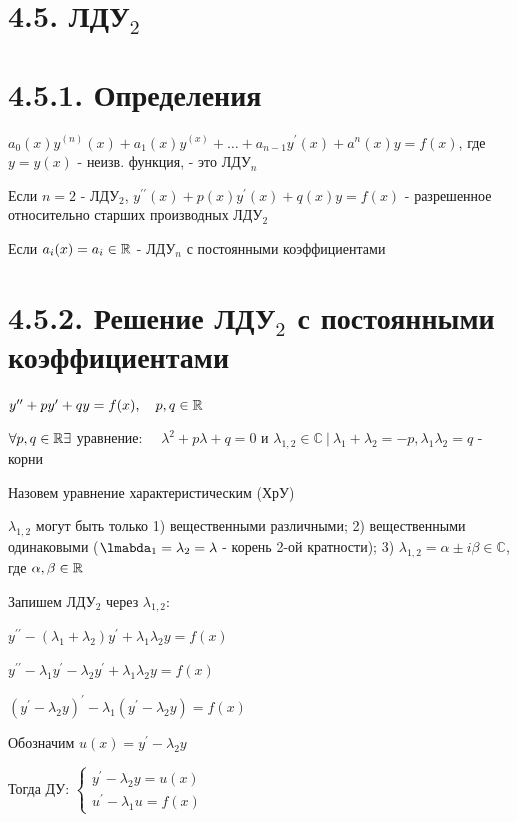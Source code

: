 \documentclass[12pt]{article}
\begin{document}
    \section{4.5. ЛДУ$_2$}


    \section{4.5.1. Определения}

    \Def $a_0(x) y^{(n)}(x) + a_1(x)y^{(x)} + \dots + a_{n - 1}y^\prime(x) + a^n(x)y = f(x)$, где $y = y(x)$ - неизв. функция, - это ЛДУ$_n$

    \Nota Если $n = 2$ - ЛДУ$_2$, $y^{\prime\prime}(x) + p(x)y^\prime(x) + q(x)y = f(x)$ - разрешенное относительно старших производных ЛДУ$_2$

    \Nota Если $a_i(x) = a_i \in \mathbb{R}$ - ЛДУ$_n$ с постоянными коэффициентами


    \section{4.5.2. Решение ЛДУ$_2$ с постоянными коэффициентами}

    $y^{\prime\prime} + p y^\prime + q y = f(x), \quad p, q \in \mathbb{R}$

    $\forall p, q \in \mathbb{R} \exists $ уравнение: $\quad \lambda^2 + p\lambda + q = 0$ и $\lambda_{1,2} \in \mathbb{C} \ | \ \lambda_1 + \lambda_2 = -p, \lambda_1 \lambda_2 = q$ - корни

    Назовем уравнение характеристическим (ХрУ) \Cat

    \Nota $\lambda_{1, 2}$ могут быть только
    1) вещественными различными;
    2) вещественными одинаковыми ($\lmabda_1 = \lambda_2 = \lambda$ - корень 2-ой кратности);
    3) $\lambda_{1,2} = \alpha \pm i \beta \in \mathbb{C}$, где $\alpha, \beta \in \mathbb{R}$

    Запишем ЛДУ$_2$ через $\lambda_{1, 2}$:

    $y^{\prime\prime} - (\lambda_1 + \lambda_2) y^\prime + \lambda_1 \lambda_2 y = f(x)$

    $y^{\prime\prime} - \lambda_1 y^\prime - \lambda_2 y^\prime + \lambda_1 \lambda_2 y = f(x)$

    $(y^\prime - \lambda_2 y)^\prime - \lambda_1 (y^\prime - \lambda_2 y) = f(x)$

    Обозначим $u(x) = y^\prime - \lambda_2 y$

    Тогда ДУ: $\begin{cases}
                   y^\prime - \lambda_2 y = u(x) \\ u^\prime - \lambda_1 u = f(x)
    \end{cases}$
\end{document}
